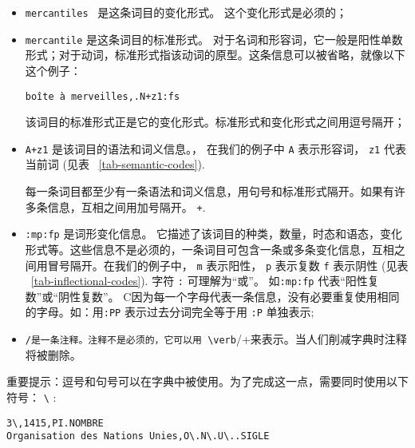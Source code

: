\bigskip
\begin{itemize}
\item \verb+mercantiles + 是这条词目的变化形式。 这个变化形式是必须的；
  
\bigskip \item \verb+mercantile+ 是这条词目的标准形式。
 对于名词和形容词，它一般是阳性单数形式；对于动词，标准形式指该动词的原型。这条信息可以被省略，就像以下这个例子：

  
\bigskip
\verb$boîte à merveilles,.N+z1:fs$
  
\bigskip 该词目的标准形式正是它的变化形式。标准形式和变化形式之间用逗号隔开；
\index{\verb+,+}
  
\bigskip \item \verb$A+z1$ 是该词目的语法和词义信息。，
 在我们的例子中 \verb+A+
表示形容词， \verb+z1+ 代表当前词 (见表 ~\ref{tab-semantic-codes}).

每一条词目都至少有一条语法和词义信息，用句号和标准形式隔开。如果有许多条信息，互相之间用加号隔开。 \verb$+$\index{\verb$+$}.
  
\bigskip
\item \verb+:mp:fp+ 是词形变化信息。
 它描述了该词目的种类，数量，时态和语态，变化形式等。这些信息不是必须的，一条词目可包含一条或多条变化信息，互相之间用冒号隔开。在我们的例子中， \verb+m+ 表示阳性，
\verb+p+ 表示复数 \verb+f+ 表示阴性 (见表 ~\ref{tab-inflectional-codes}). 字符 \verb+:+ 可理解为“或”。 如\verb+:mp:fp+ 代表“阳性复数”或“阴性复数”。 C因为每一个字母代表一条信息，没有必要重复使用相同的字母。如：用\verb+:PP+ 表示过去分词完全等于用 \verb+:P+ 单独表示;\index{\verb+:+}
  
\bigskip \item \verb+/是一条注释。注释不是必须的，它可以用 \verb+/+来表示。当人们削减字典时注释将被删除。 \index{\verb+/+}
\end{itemize}

\bigskip
\noindent 重要提示：逗号和句号可以在字典中被使用。为了完成这一点，需要同时使用以下符号：
\verb+\+ \index{\verb+\,+}\index{\verb+\.+}\index{\verb+\+}:

\bigskip
\begin{verbatim}
3\,1415,PI.NOMBRE
Organisation des Nations Unies,O\.N\.U\..SIGLE
\end{verbatim}


